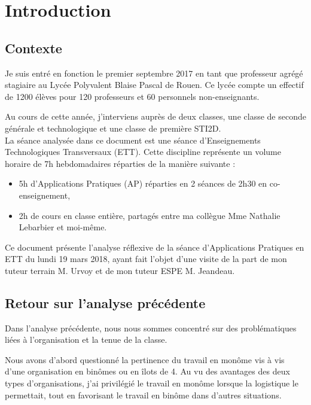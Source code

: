 \documentclass[pdftex,a4paper,12pt]{article}
\begin{document}
	
	\section{Introduction}
 	\subsection{Contexte}
	Je suis entré en fonction le premier septembre 2017 en tant que professeur agrégé stagiaire au Lycée Polyvalent Blaise Pascal de Rouen.
	Ce lycée compte un effectif de 1200 élèves pour 120 professeurs et 60 personnels non-enseignants.

	Au cours de cette année, j'interviens auprès de deux classes, une classe de seconde générale et technologique et une classe de première STI2D.\\

	La séance analysée dans ce document est une séance d'Enseignements Technologiques Transversaux (ETT).
	Cette discipline représente un volume horaire de 7h hebdomadaires réparties de la manière suivante : 
	\begin{itemize}
		\item 5h d'Applications Pratiques (AP) réparties en 2 séances de 2h30 en co-enseignement,
		\item 2h de cours en classe entière, partagés entre ma collègue Mme Nathalie Lebarbier et moi-même.\\
	\end{itemize}

	Ce document présente l'analyse réflexive de la séance d'Applications Pratiques en ETT du lundi 19 mars 2018, ayant fait l'objet d'une visite de la part de mon tuteur terrain M. Urvoy et de mon tuteur ESPE M. Jeandeau.

	\subsection{Retour sur l'analyse précédente}
	Dans l'analyse précédente, nous nous sommes concentré sur des problématiques liées à l'organisation et la tenue de la classe.

	Nous avons d'abord questionné la pertinence du travail en monôme vis à vis d'une organisation en binômes ou en îlots de 4.
	Au vu des avantages des deux types d'organisations, j'ai privilégié le travail en monôme lorsque la logistique le permettait,
	tout en favorisant le travail en binôme dans d'autres situations.\\
\end{document}
